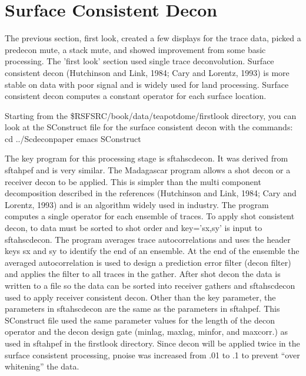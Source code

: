 

\section{Surface Consistent Decon}
The previous section, first look, created a few displays for the trace data, picked a predecon mute, a stack mute, and showed improvement from some basic processing.  The 'first look' section used single trace deconvolution.  Surface consistent decon (Hutchinson and Link, 1984; Cary and Lorentz, 1993) is more stable on data with poor signal and is widely used for land processing.  Surface consistent decon computes a constant operator for each surface location.  

Starting from the \$RSFSRC/book/data/teapotdome/firstlook directory, you can look at the SConstruct file for the surface consistent decon with the commands:
cd ../Scdeconpaper
emacs SConstruct

The key program for this processing stage is sftahscdecon.  It was derived from sftahpef and is very similar.  The Madagascar program allows a shot decon or a receiver decon to be applied.  This is simpler than the multi component decomposition described in the references  (Hutchinson and Link, 1984; Cary and Lorentz, 1993) and is an algorithm widely used in industry.  The program computes a single operator for each ensemble of traces.  To apply shot consistent decon, to data must be sorted to shot order and key='sx,sy' is input to sftahscdecon.  The program averages trace autocorrelations and uses the header keys sx and sy to identify the end of an ensemble.  At the end of the ensemble the averaged autocorrelation is used to design a prediction error filter (decon filter) and applies the filter to all traces in the gather.  After shot decon the data is written to a file so the data can be sorted into receiver gathers and sftahscdecon used to apply receiver consistent decon.  Other than the key parameter, the parameters in sftahscdecon are the same as the parameters in sftahpef.  This SConstruct file used the same parameter values for the length of the decon operator and the decon design gate (minlag, maxlag, minfor, and maxcorr.) as used in sftahpef in the firstlook directory.  Since decon will be applied twice in the surface consistent processing, pnoise was increased from .01 to .1 to prevent “over whitening”  the data.

